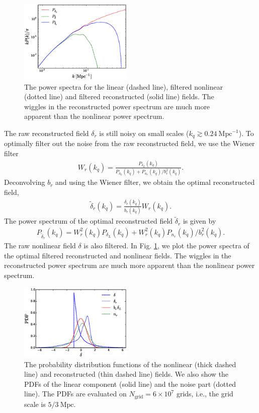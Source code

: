 \documentclass[aps,prd,twocolumn,showpacs,superscriptaddress,groupedaddress,nofootinbib]{revtex4}  %
\newcommand{\mr}{\mathrm}
\newcommand{\bea}{\begin{eqnarray}}
\newcommand{\eea}{\end{eqnarray}}
\begin{document}
\begin{figure}[tbp]
\begin{center}
\includegraphics[width=0.48\textwidth]{f5.eps}
\end{center}
\vspace{-0.7cm}
\caption{The power spectra for the linear (dashed line), filtered nonlinear
(dotted line) and filtered reconstructed (solid line) fields.
The wiggles in the reconstructed power 
spectrum are much more apparent than the nonlinear power spectrum.}
\label{fig:wf}
\end{figure}


The raw reconstructed field $\delta_r$ is still noisy on small scales 
($k_q\gtrsim0.24\ \mr{Mpc}^{-1}$). To optimally filter out the noise from the 
raw reconstructed field, we use the Wiener filter
\bea
W_r(k_q)=\frac{P_{\delta_L}(k_q)}{P_{\delta_L}(k_q)+P_{n_r}(k_q)/b_r^2(k_q)}.
\eea
Deconvolving $b_r$ and using the Wiener filter, we obtain the optimal 
reconstructed field,
\bea
\tilde{\delta}_r(k_q)=\frac{\delta_r(k_q)}{b_r(k_q)}W_r(k_q).
\eea
The power spectrum of the optimal reconstructed field $\tilde{\delta}_r$ is 
given by
\bea
P_{\tilde{\delta}_r}(k_q)=W_r^2(k_q)P_{\delta_L}(k_q)+W_r^2(k_q)
{P_{n_r}(k_q)}/{b_r^2(k_q)}.
\eea
The raw nonlinear field $\delta$ is also filtered. 
In Fig. \ref{fig:wf}, we plot the power spectra of the optimal filtered 
reconstructed and nonlinear fields. The wiggles in the reconstructed power 
spectrum are much more apparent than the nonlinear power spectrum.

\begin{figure}[tbp]
\begin{center}
\includegraphics[width=0.48\textwidth]{f6.eps}
\end{center}
\vspace{-0.7cm}
\caption{The probability distribution functions of the nonlinear (thick dashed 
line) and reconstructed (thin dashed line) fields. 
We also show the PDFs of the linear component 
(solid line) and the noise part (dotted line). The PDFs are evaluated on 
$N_\mr{grid}=6\times10^7$ grids, i.e., the grid scale is $5/3\ \mr{Mpc}$.}
\label{fig:pdf}
\end{figure}
\end{document}
